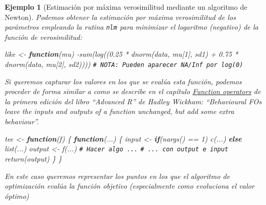 \documentclass[
  10pt,
]{book}
\newenvironment{Shaded}{\begin{snugshade}}{\end{snugshade}}
\newcommand{\CommentTok}[1]{\textcolor[rgb]{0.56,0.35,0.01}{\textit{#1}}}
\newcommand{\ControlFlowTok}[1]{\textcolor[rgb]{0.13,0.29,0.53}{\textbf{#1}}}
\newcommand{\DecValTok}[1]{\textcolor[rgb]{0.00,0.00,0.81}{#1}}
\newcommand{\FloatTok}[1]{\textcolor[rgb]{0.00,0.00,0.81}{#1}}
\newcommand{\FunctionTok}[1]{\textcolor[rgb]{0.00,0.00,0.00}{#1}}
\newcommand{\NormalTok}[1]{#1}
\newcommand{\OtherTok}[1]{\textcolor[rgb]{0.56,0.35,0.01}{#1}}
\newcommand{\SpecialCharTok}[1]{\textcolor[rgb]{0.00,0.00,0.00}{#1}}
\theoremstyle{break}
\newtheorem{example}{Ejemplo}[chapter]
\theoremstyle{nonumberplain}
\renewcommand{\CommentTok}[1]{\textcolor[rgb]{0.41,0.41,0.41}{\texttt{#1}}}
\begin{document}
\begin{example}[Estimación por máxima verosimilitud mediante un algoritmo de Newton]
Podemos obtener la estimación por máxima verosimilitud de los parámetros empleando la rutina \texttt{nlm} para minimizar el logaritmo (negativo) de la función de verosimilitud:

\begin{Shaded}
\begin{Highlighting}[]
\NormalTok{like }\OtherTok{\textless{}{-}} \ControlFlowTok{function}\NormalTok{(mu)}
  \SpecialCharTok{{-}}\FunctionTok{sum}\NormalTok{(}\FunctionTok{log}\NormalTok{((}\FloatTok{0.25} \SpecialCharTok{*} \FunctionTok{dnorm}\NormalTok{(data, mu[}\DecValTok{1}\NormalTok{], sd1) }\SpecialCharTok{+} \FloatTok{0.75} \SpecialCharTok{*} \FunctionTok{dnorm}\NormalTok{(data, mu[}\DecValTok{2}\NormalTok{], sd2))))}
  \CommentTok{\# NOTA: Pueden aparecer NA/Inf por log(0)}
\end{Highlighting}
\end{Shaded}

Si queremos capturar los valores en los que se evalúa esta función, podemos proceder de forma similar a como se describe en el capítulo
\href{http://adv-r.had.co.nz/Function-operators.html\#behavioural-fos}{Function operators}
de la primera edición del libro ``Advanced R'' de Hadley Wickham:
``Behavioural FOs leave the inputs and outputs of a function unchanged,
but add some extra behaviour''.

\begin{Shaded}
\begin{Highlighting}[]
\NormalTok{tee }\OtherTok{\textless{}{-}} \ControlFlowTok{function}\NormalTok{(f) \{}
  \ControlFlowTok{function}\NormalTok{(...) \{}
\NormalTok{    input }\OtherTok{\textless{}{-}} \ControlFlowTok{if}\NormalTok{(}\FunctionTok{nargs}\NormalTok{() }\SpecialCharTok{==} \DecValTok{1}\NormalTok{) }\FunctionTok{c}\NormalTok{(...) }\ControlFlowTok{else} \FunctionTok{list}\NormalTok{(...)}
\NormalTok{    output }\OtherTok{\textless{}{-}} \FunctionTok{f}\NormalTok{(...)}
    \CommentTok{\# Hacer algo ...}
    \CommentTok{\# ... con output e input}
    \FunctionTok{return}\NormalTok{(output)}
\NormalTok{  \}}
\NormalTok{\}}
\end{Highlighting}
\end{Shaded}

En este caso queremos representar los puntos en los que el algoritmo de optimización evalúa la función objetivo (especialmente como evoluciona el valor óptimo)


\end{example}
\end{document}
